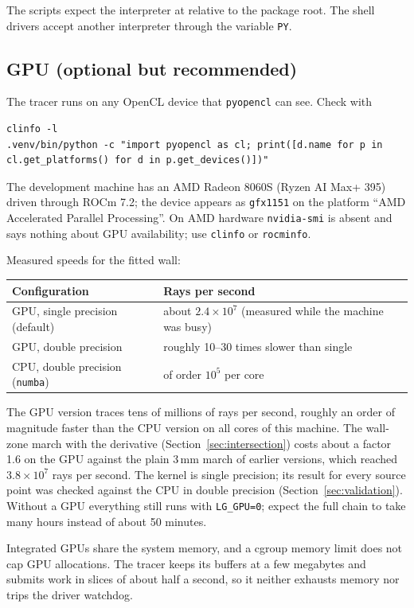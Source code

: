 \documentclass[11pt,a4paper]{article}
\newcommand{\code}[1]{\texttt{#1}}
\begin{document}
The scripts expect the interpreter at  relative to the package root. The
shell drivers accept another interpreter through the variable \code{PY}.

\subsection{GPU (optional but recommended)}

The tracer runs on any OpenCL device that \code{pyopencl} can see. Check with
\begin{lstlisting}
clinfo -l
.venv/bin/python -c "import pyopencl as cl; print([d.name for p in cl.get_platforms() for d in p.get_devices()])"
\end{lstlisting}
The development machine has an AMD Radeon 8060S (Ryzen AI Max+ 395) driven through ROCm 7.2; the
device appears as \code{gfx1151} on the platform ``AMD Accelerated Parallel Processing''. On AMD
hardware \code{nvidia-smi} is absent and says nothing about GPU availability; use \code{clinfo} or
\code{rocminfo}.

Measured speeds for the fitted wall:

\begin{tabularx}{\textwidth}{@{}L{6.2cm}Y@{}}
\toprule
Configuration & Rays per second \\
\midrule
GPU, single precision (default) & about $2.4\times10^{7}$ (measured while the machine was busy) \\
GPU, double precision & roughly 10--30 times slower than single \\
CPU, double precision (\code{numba}) & of order $10^{5}$ per core \\
\bottomrule
\end{tabularx}

The GPU version traces tens of millions of rays per second, roughly an order of magnitude faster than
the CPU version on all cores of this machine. The wall-zone march with the derivative
(Section~\ref{sec:intersection}) costs about a factor 1.6 on the GPU against the plain 3\,mm march of
earlier versions, which reached $3.8\times10^{7}$ rays per second. The kernel is single precision; its
result for every source point was checked against the CPU in double precision
(Section~\ref{sec:validation}). Without a GPU everything still runs with \code{LG\_GPU=0}; expect the
full chain to take many hours instead of about 50 minutes.

Integrated GPUs share the system memory, and a cgroup memory limit does not cap GPU allocations. The
tracer keeps its buffers at a few megabytes and submits work in slices of about half a second, so it
neither exhausts memory nor trips the driver watchdog.
\end{document}
